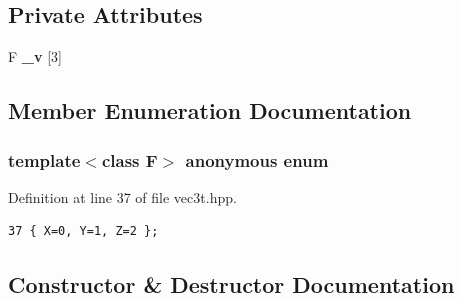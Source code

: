 \subsection*{Private Attributes}
\begin{CompactItemize}
\item 
F {\bf \_\-v} [3]
\end{CompactItemize}


\subsection{Member Enumeration Documentation}
\subsubsection{\setlength{\rightskip}{0pt plus 5cm}template$<$class F$>$ anonymous enum}\label{classVec3T_dca29a1140aadadfd92b34a02fa516ef_dca29a1140aadadfd92b34a02fa516ef}


\begin{Desc}
\item[Enumerator: ]\par
\begin{description}
\item[{\em 
X\label{classVec3T_dca29a1140aadadfd92b34a02fa516ef_dca29a1140aadadfd92b34a02fa516ef02129bb861061d1a052c592e2dc6b383}
}]\item[{\em 
Y\label{classVec3T_dca29a1140aadadfd92b34a02fa516ef_dca29a1140aadadfd92b34a02fa516ef57cec4137b614c87cb4e24a3d003a3e0}
}]\item[{\em 
Z\label{classVec3T_dca29a1140aadadfd92b34a02fa516ef_dca29a1140aadadfd92b34a02fa516ef21c2e59531c8710156d34a3c30ac81d5}
}]\end{description}
\end{Desc}



Definition at line 37 of file vec3t.hpp.

\footnotesize\begin{verbatim}37 { X=0, Y=1, Z=2 };
\end{verbatim}\normalsize 




\subsection{Constructor \& Destructor Documentation}
